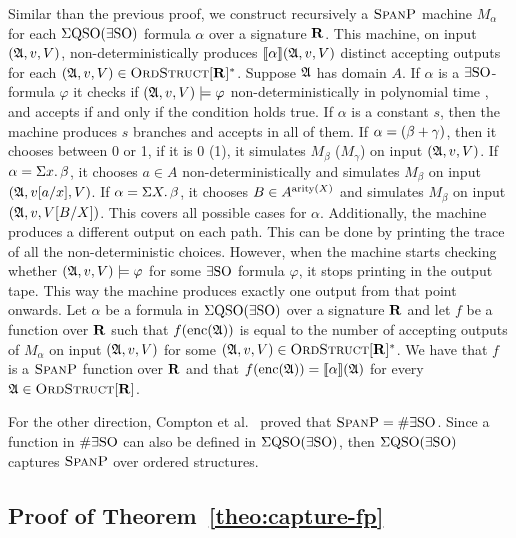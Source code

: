 Similar than the previous proof, we construct recursively a $\text{\sc SpanP}$ machine $M_{\alpha}$ for each $\Sigma{\rm QSO}(\exists{\rm SO})$ formula $\alpha$ over a signature $\mathbf{R}$. This machine, on input $(\mathfrak{A},v,V)$, non-deterministically produces ${\llbracket{}{\alpha}\rrbracket}(\mathfrak{A},v,V)$ distinct accepting outputs for each $(\mathfrak{A},v,V) \in \text{\sc OrdStruct}[\mathbf{R}]^*$. Suppose $\mathfrak{A}$ has domain $A$. 
If $\alpha$ is a $\exists{\rm SO}$-formula $\varphi$ it checks if $(\mathfrak{A},v,V)\models\varphi$ non-deterministically in polynomial time \cite{fagin1974generalized}, and accepts if and only if the condition holds true. 
If $\alpha$ is a constant $s$, then the machine produces $s$ branches and accepts in all of them. 
If $\alpha = (\beta + \gamma)$, then it chooses between 0 or 1, if it is 0 (1), it simulates $M_{\beta}$ ($M_{\gamma}$) on input $(\mathfrak{A},v,V)$.  
If $\alpha = \Sigma{x}.\,\beta$, it chooses $a\in A$ non-deterministically and simulates $M_{\beta}$ on input $(\mathfrak{A},v[a/x],V)$. 
If $\alpha = \Sigma{X}.\, \beta$, it chooses $B\in A^{{\rm arity}(X)}$ and simulates $M_{\beta}$ on input $(\mathfrak{A},v,V[B/X])$. 
This covers all possible cases for $\alpha$.
Additionally, the machine produces a different output on each path. This can be done by printing the trace of all the non-deterministic choices.
However, when the machine starts checking whether $(\mathfrak{A},v,V)\models\varphi$ for some $\exists{\rm SO}$ formula $\varphi$, it stops printing in the output tape. This way the machine produces exactly one output from that point onwards.
Let $\alpha$ be a formula in $\Sigma{\rm QSO}(\exists{\rm SO})$ over a signature $\mathbf{R}$ and let $f$ be a function over $\mathbf{R}$ such that $f({\rm enc}(\mathfrak{A}))$ is equal to the number of accepting outputs of $M_{\alpha}$ on input $(\mathfrak{A},v,V)$ for some $(\mathfrak{A},v,V) \in \text{\sc OrdStruct}[\mathbf{R}]^*$. 
We have that $f$ is a $\text{\sc SpanP}$ function over $\mathbf{R}$ and that $f({\rm enc}(\mathfrak{A})) = {\llbracket{}{\alpha}\rrbracket}(\mathfrak{A})$ for every $\mathfrak{A}\in\text{\sc OrdStruct}[\mathbf{R}]$.

For the other direction, Compton et al.~\cite{ComptonG96} proved that $\text{\sc SpanP} = \#\exists{\rm SO}$. Since a function in $\#\exists{\rm SO}$ can also be defined in $\Sigma{\rm QSO}(\exists{\rm SO})$, then $\Sigma{\rm QSO}(\exists{\rm SO})$ captures $\text{\sc SpanP}$ over ordered structures.

\medskip

\subsection*{Proof of Theorem~\ref{theo:capture-fp}}

